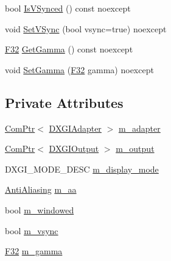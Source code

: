 \begin{DoxyCompactItemize}
\item 
bool \hyperlink{classmage_1_1rendering_1_1_display_configuration_a6447404f1d720b98b37f684ba0e790a0}{Is\+V\+Synced} () const noexcept
\item 
void \hyperlink{classmage_1_1rendering_1_1_display_configuration_a304a29762afd99caa1672ef6cc259fb3}{Set\+V\+Sync} (bool vsync=true) noexcept
\item 
\hyperlink{namespacemage_aa97e833b45f06d60a0a9c4fc22ae02c0}{F32} \hyperlink{classmage_1_1rendering_1_1_display_configuration_a84dec99b487839003fce7c9704dc031d}{Get\+Gamma} () const noexcept
\item 
void \hyperlink{classmage_1_1rendering_1_1_display_configuration_a1d8d4b2f3b79e53d9b36da3f6a0ddf69}{Set\+Gamma} (\hyperlink{namespacemage_aa97e833b45f06d60a0a9c4fc22ae02c0}{F32} gamma) noexcept
\end{DoxyCompactItemize}
\subsection*{Private Attributes}
\begin{DoxyCompactItemize}
\item 
\hyperlink{namespacemage_ae74f374780900893caa5555d1031fd79}{Com\+Ptr}$<$ \hyperlink{namespacemage_1_1rendering_ad55e028ebd705b547eeb972ad8d03b6a}{D\+X\+G\+I\+Adapter} $>$ \hyperlink{classmage_1_1rendering_1_1_display_configuration_a307a8e6e0b1beb93175a6db519759e86}{m\+\_\+adapter}
\item 
\hyperlink{namespacemage_ae74f374780900893caa5555d1031fd79}{Com\+Ptr}$<$ \hyperlink{namespacemage_1_1rendering_aaf22d3893277a4bd8497f6ea69b01532}{D\+X\+G\+I\+Output} $>$ \hyperlink{classmage_1_1rendering_1_1_display_configuration_a3f43cbe5bb1a1a7c1bfb9ce66052fe0a}{m\+\_\+output}
\item 
D\+X\+G\+I\+\_\+\+M\+O\+D\+E\+\_\+\+D\+E\+SC \hyperlink{classmage_1_1rendering_1_1_display_configuration_a577ada006ada1b1e65a8deb817f0dafe}{m\+\_\+display\+\_\+mode}
\item 
\hyperlink{namespacemage_1_1rendering_ac3f75e49e92b42f2f5fb55c450d8899c}{Anti\+Aliasing} \hyperlink{classmage_1_1rendering_1_1_display_configuration_a03754a6d492393f70f68c619311dfa4c}{m\+\_\+aa}
\item 
bool \hyperlink{classmage_1_1rendering_1_1_display_configuration_a9d2117628e8b8f6a9b6548a9c0b11c36}{m\+\_\+windowed}
\item 
bool \hyperlink{classmage_1_1rendering_1_1_display_configuration_a749335db324a29c8b4ac30acf1c5361d}{m\+\_\+vsync}
\item 
\hyperlink{namespacemage_aa97e833b45f06d60a0a9c4fc22ae02c0}{F32} \hyperlink{classmage_1_1rendering_1_1_display_configuration_ac01844bb757c13e438c9ef3281becd4e}{m\+\_\+gamma}
\end{DoxyCompactItemize}


